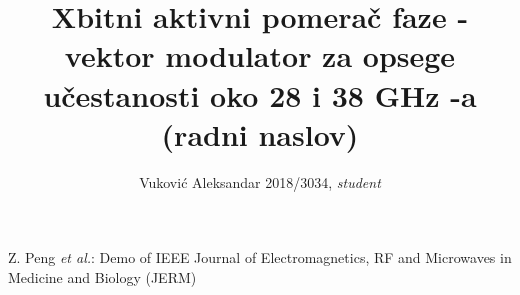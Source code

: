 \documentclass[journal,twocolumn,letterpaper]{IEEEJERM}
\begin{document}
%
\title{Xbitni aktivni pomerač faze - vektor modulator za opsege učestanosti oko 28 i 38 GHz -a (radni naslov)}

%
\author{Vuković Aleksandar 2018/3034, \textit{student} %
}%

{Z. Peng \MakeLowercase{\textit{et al.}}: Demo of IEEE Journal of Electromagnetics, RF and Microwaves in Medicine and Biology (JERM)}






\end{document}
